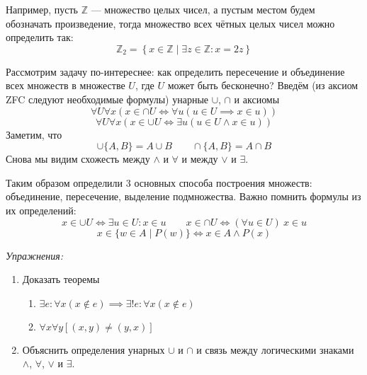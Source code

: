 \newcommand\Z{\mathbb Z}
Например, пусть $\Z$ --- множество целых чисел, а пустым местом будем обозначать
произведение, тогда
множество всех чётных целых чисел можно определить так:
\[
	\Z_{2}=\left\{x\in\Z\;\big|\;\exists z\in\Z:x=2z\right\}
\]

Рассмотрим задачу по-интереснее: как определить пересечение и объединение
всех множеств в множестве $U$, где $U$ может быть бесконечно?
Введём (из аксиом ZFC следуют необходимые формулы) унарные $\cup$, $\cap$
и аксиомы
\[
	\forall U\forall x(x\in \cap U\iff \forall u(u\in U\implies x\in u))
\]
\[
	\forall U\forall x(x\in \cup U\iff \exists u(u\in U\land x\in u))
\]
Заметим, что
\[
	\cup \{A,B\}=A\cup B\qquad \cap \{A,B\}=A\cap B
\]
Снова мы видим схожесть между $\land$ и $\forall$ и между $\lor$ и $\exists$.

Таким образом определили 3 основных способа построения множеств:
объединение, пересечение, выделение подмножества. Важно помнить
формулы из их определений:
\[
	x\in \cup U\iff \exists u\in U:x\in u\qquad
	x\in \cap U\iff (\forall u\in U)~x\in u
\]
\[
	x\in \{w\in A\;\big|\; P(w)\}\iff x\in A\land P(x)
\]

\vspace{1em}
{\it Упражнения:}
\begin{enumerate}
	\item{}Доказать теоремы
		\begin{enumerate}
			\item{}${\exists e:\forall x(x\notin e)\implies
				\exists!e:\forall x(x\notin e)}$ \label{ex:eset_only}
			\item{}$\forall x\forall y[(x,y)\neq (y,x)]$
		\end{enumerate}
	\item{}Объяснить определения унарных $\cup$ и $\cap$
		и связь между логическими знаками $\land$, $\forall$, $\lor$ и $\exists$.
\end{enumerate}
